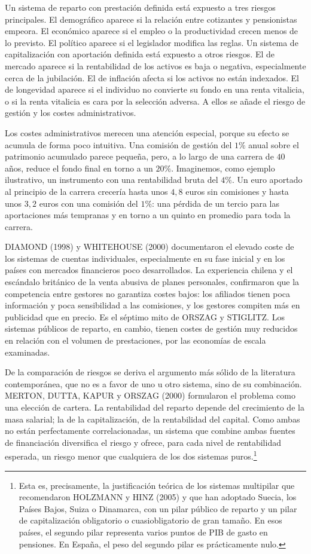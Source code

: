 \documentclass[10pt,a4paper]{article}
\begin{document}
Un sistema de reparto con prestación definida está expuesto a tres riesgos principales. El demográfico aparece si la relación entre cotizantes y pensionistas empeora. El económico aparece si el empleo o la productividad crecen menos de lo previsto. El político aparece si el legislador modifica las reglas. Un sistema de capitalización con aportación definida está expuesto a otros riesgos. El de mercado aparece si la rentabilidad de los activos es baja o negativa, especialmente cerca de la jubilación. El de inflación afecta si los activos no están indexados. El de longevidad aparece si el individuo no convierte su fondo en una renta vitalicia, o si la renta vitalicia es cara por la selección adversa. A ellos se añade el riesgo de gestión y los costes administrativos.

Los costes administrativos merecen una atención especial, porque su efecto se acumula de forma poco intuitiva. Una comisión de gestión del $1\%$ anual sobre el patrimonio acumulado parece pequeña, pero, a lo largo de una carrera de $40$ años, reduce el fondo final en torno a un $20\%$. Imaginemos, como ejemplo ilustrativo, un instrumento con una rentabilidad bruta del $4\%$. Un euro aportado al principio de la carrera crecería hasta unos $4,8$ euros sin comisiones y hasta unos $3,2$ euros con una comisión del $1\%$: una pérdida de un tercio para las aportaciones más tempranas y en torno a un quinto en promedio para toda la carrera. 

DIAMOND (1998) y WHITEHOUSE (2000) documentaron el elevado coste de los sistemas de cuentas individuales, especialmente en su fase inicial y en los países con mercados financieros poco desarrollados. La experiencia chilena y el escándalo británico de la venta abusiva de planes personales, confirmaron que la competencia entre gestores no garantiza costes bajos: los afiliados tienen poca información y poca sensibilidad a las comisiones, y los gestores compiten más en publicidad que en precio. Es el séptimo mito de ORSZAG y STIGLITZ. Los sistemas públicos de reparto, en cambio, tienen costes de gestión muy reducidos en relación con el volumen de prestaciones, por las economías de escala examinadas.

De la comparación de riesgos se deriva el argumento más sólido de la literatura contemporánea, que no es a favor de uno u otro sistema, sino de su combinación. MERTON, DUTTA, KAPUR y ORSZAG (2000) formularon el problema como una elección de cartera. La rentabilidad del reparto depende del crecimiento de la masa salarial; la de la capitalización, de la rentabilidad del capital. Como ambas no están perfectamente correlacionadas, un sistema que combine ambas fuentes de financiación diversifica el riesgo y ofrece, para cada nivel de rentabilidad esperada, un riesgo menor que cualquiera de los dos sistemas puros.\footnote{Esta es, precisamente, la justificación teórica de los sistemas multipilar que recomendaron HOLZMANN y HINZ (2005) y que han adoptado Suecia, los Países Bajos, Suiza o Dinamarca, con un pilar público de reparto y un pilar de capitalización obligatorio o cuasiobligatorio de gran tamaño. En esos países, el segundo pilar representa varios puntos de PIB de gasto en pensiones. En España, el peso del segundo pilar es prácticamente nulo. 
}
\end{document}
